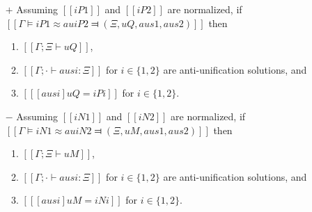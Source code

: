 \begin{lemma} \label{lemma:anti-unification-soundness}
    \hfill
    \begin{itemize}
        \item [$+$]  Assuming $[[iP1]]$ and $[[iP2]]$ are normalized,
        if $[[Γ ⊨ iP1 ≈au iP2 ⫤ (Ξ, uQ, aus1, aus2)]]$
        then 
        \begin{enumerate}
            \item $[[Γ ; Ξ ⊢ uQ]]$,
            \item $[[Γ ; · ⊢ ausi : Ξ]]$ for $i \in \{1,2\}$
            are anti-unification solutions, and
            \item $[[ [ausi] uQ = iPi ]]$ for $i \in \{1,2\}$.
        \end{enumerate}

        \item [$-$] Assuming $[[iN1]]$ and $[[iN2]]$ are normalized,
        if $[[Γ ⊨ iN1 ≈au iN2 ⫤ (Ξ, uM, aus1, aus2)]]$
        then
        \begin{enumerate}
            \item $[[Γ ; Ξ ⊢ uM]]$,
            \item $[[Γ ; · ⊢ ausi : Ξ]]$ for $i \in \{1,2\}$
            are anti-unification solutions, and
            \item $[[ [ausi] uM = iNi ]]$ for $i \in \{1,2\}$.
        \end{enumerate}
    \end{itemize}
\end{lemma}
